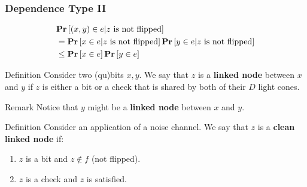 \documentclass{beamer}
\begin{document}
\begin{frame}
  \frametitle{Dependence Type II}
  \begin{figure}[h]
  \end{figure}

  \begin{align*}
    & \mathbf{Pr} \left[  (x,y) \in e | z \text{ is not flipped}  \right]  \\
    & = \mathbf{Pr} \left[  x \in e | z \text{ is not flipped}  \right]  \mathbf{Pr} \left[  y \in e | z \text{ is not flipped}  \right] \\ 
    & \le \mathbf{Pr} \left[  x \in e  \right]\mathbf{Pr} \left[  y \in e  \right]
  \end{align*}

\end{frame}


\begin{frame}
  \begin{block}{Definition}
Consider two (qu)bits $x,y$. We say that $z$ is a \textbf{linked node} between $x$ and $y$ if $z$ is either a bit or a check that is shared by both of their $D$ light cones.
  \end{block}

  \begin{block}{Remark}
    Notice that $y$ might be a \textbf{linked node} between $x$ and $y$.
  \end{block}

  \begin{block}{Definition}
    Consider an application of a noise channel. We say that $z$ is a \textbf{clean linked node} if:
    \begin{enumerate}
      \item $z$ is a bit and  $z \notin f$ (not flipped). 
      \item $z$ is a check and $z$ is satisfied. 
    \end{enumerate}
  \end{block}
\end{frame}
\end{document}

